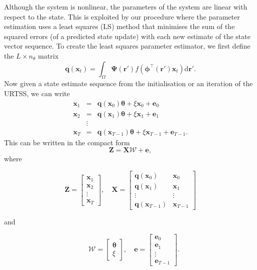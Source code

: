 \documentclass[12pt]{iopart}
\begin{document}
Although the system is nonlinear, the parameters of the system are linear with respect to the state. This is exploited by our procedure where the parameter estimation uses a least squares (LS) method that minimises the sum of the squared errors (of a predicted state update) with each new estimate of the state vector sequence. To create the least squares parameter estimator, we first define the $L \times n_{\theta}$ matrix
\begin{equation}
	\mathbf{q}(\mathbf{x}_t) = \int_\Omega \boldsymbol{\Psi}(\mathbf{r}') f(\boldsymbol{\phi}^{\top}(\mathbf{r}')\mathbf{x}_t) \textrm{d}\mathbf{r}'.
\end{equation}
Now given a state estimate sequence from the initialisation or an iteration of the URTSS, we can write
\begin{eqnarray*}
	\mathbf x_{1} &=& \mathbf{q}(\mathbf x_0) \boldsymbol{\theta}+\xi\mathbf x_0+\mathbf e_0 \\
	\mathbf x_{2} &=& \mathbf{q}(\mathbf x_1) \boldsymbol{\theta}+\xi\mathbf x_1+\mathbf e_1  \\
	&\vdots& \\
	\mathbf x_{T}&=& \mathbf{q}(\mathbf x_{T-1}) \boldsymbol{\theta}+\xi\mathbf x_{T-1}+\mathbf e_{T-1}. 
\end{eqnarray*}
This can be written in the compact form
\begin{equation}
	\mathbf Z=\mathbf X \mathcal W+\mathbf{e}, 
\end{equation}
where
\begin{small}
\begin{equation*}
	\mathbf Z=\left[
	\begin{array}{cccc}
		\mathbf x_{1}\\
		\mathbf x_{2}\\
		\vdots\\
		\mathbf x_{T}
	\end{array}
	\right],\quad \mathbf X=\left[
	\begin{array}{cccc}
		\mathbf q(\mathbf x_0)& \mathbf x_{0}\\
		\mathbf q(\mathbf x_1)& \mathbf x_{1}\\
		\vdots & \vdots\\
		\mathbf q(\mathbf x_{T-1})& \mathbf x_{T-1}
	\end{array}
	\right] 
\end{equation*}
\end{small}
and
\begin{small}
\begin{equation*}
\quad \mathcal W=\left[
	\begin{array}{cc}
		\boldsymbol{\theta} \\
		\xi
	\end{array}
	\right],\quad \mathbf{e}=\left[
	\begin{array}{cccc}
		\mathbf e_0\\
		\mathbf e_1\\
		\vdots\\
		\mathbf e_{T-1}
	\end{array}
	\right].
\end{equation*}
\end{small}
\end{document}
